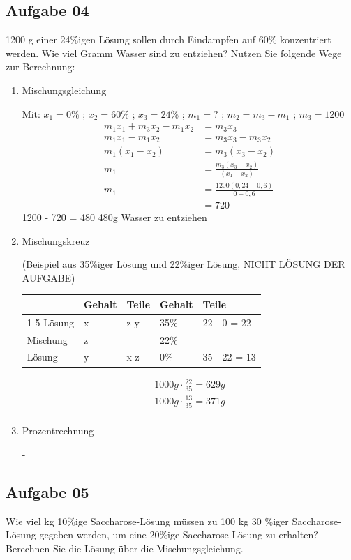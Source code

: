 \documentclass[a4paper,10pt]{article}
\begin{document}
\subsection*{Aufgabe 04}
1200 g einer 24\%igen Lösung sollen durch Eindampfen auf 60\% konzentriert werden. Wie viel
Gramm Wasser sind zu entziehen? Nutzen Sie folgende Wege zur Berechnung:
\reversemarginpar
{}
\begin{enumerate}[label=\alph*)]
\item Mischungsgleichung
\par 
Mit: $x_1 = 0\%$ ; $x_2 = 60\%$ ; $x_3 = 24\%$ ; $m_1 = ?$ ; $m_2 = m_3 - m_1$ ; $m_3 = 1200$
\begin{align*}
m_1x_1 + m_3x_2 - m_1x_2 &= m_3x_3 \\
m_1x_1 - m_1x_2 &= m_3x_3 - m_3x_2 \\
m_1(x_1-x_2) &= m_3(x_3-x_2) \\
m_1 &= \frac{m_3(x_3-x_2)}{(x_1-x_2)} \\
m_1 &= \frac{1200(0,24-0,6)}{0-0,6}\\
 &= 720
\end{align*}
1200 - 720 = 480 \RA 480g Wasser zu entziehen
\item Mischungskreuz \par (Beispiel aus 35\%iger Lösung und 22\%iger Lösung, NICHT LÖSUNG DER AUFGABE) \par 
\begin{tabular}{lllll}
 &Gehalt&Teile&Gehalt&Teile \\ \cline{1-5}
 Lösung &x&z-y&35\% &22 - 0 = 22 \\
 Mischung & z &&22\% & \\
 Lösung &y& x-z & 0\% & 35 - 22 = 13
\end{tabular}

\begin{align*}
1000g \cdot \frac{22}{35} = 629g \\
1000g \cdot \frac{13}{35} = 371g \\
\end{align*}
\item Prozentrechnung \par 
-
\end{enumerate}

\pagebreak
\subsection*{Aufgabe 05}
Wie viel kg 10\%ige Saccharose-Lösung müssen zu 100 kg 30 \%iger Saccharose-Lösung
gegeben werden, um eine 20\%ige Saccharose-Lösung zu erhalten? Berechnen Sie die Lösung
über die Mischungsgleichung.
\end{document}
